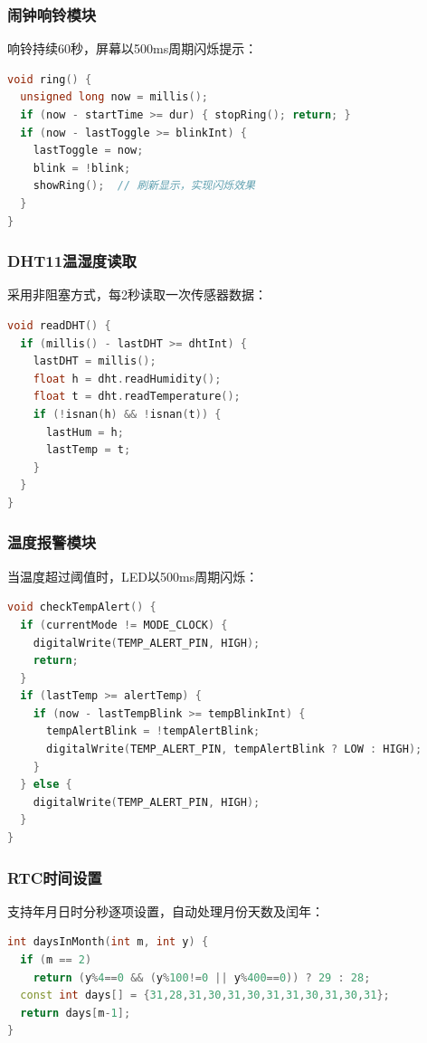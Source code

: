 \documentclass[12pt,a4paper]{article}
\begin{document}
\subsubsection*{闹钟响铃模块}
响铃持续60秒，屏幕以500ms周期闪烁提示：
\begin{lstlisting}[language=C++, caption=响铃处理函数]
void ring() {
  unsigned long now = millis();
  if (now - startTime >= dur) { stopRing(); return; }
  if (now - lastToggle >= blinkInt) {
    lastToggle = now;
    blink = !blink;
    showRing();  // 刷新显示，实现闪烁效果
  }
}
\end{lstlisting}

\subsubsection*{DHT11温湿度读取}
采用非阻塞方式，每2秒读取一次传感器数据：
\begin{lstlisting}[language=C++, caption=温湿度读取函数]
void readDHT() {
  if (millis() - lastDHT >= dhtInt) {
    lastDHT = millis();
    float h = dht.readHumidity();
    float t = dht.readTemperature();
    if (!isnan(h) && !isnan(t)) { 
      lastHum = h; 
      lastTemp = t; 
    }
  }
}
\end{lstlisting}

\subsubsection*{温度报警模块}
当温度超过阈值时，LED以500ms周期闪烁：
\begin{lstlisting}[language=C++, caption=温度报警函数]
void checkTempAlert() {
  if (currentMode != MODE_CLOCK) {
    digitalWrite(TEMP_ALERT_PIN, HIGH);
    return;
  }
  if (lastTemp >= alertTemp) {
    if (now - lastTempBlink >= tempBlinkInt) {
      tempAlertBlink = !tempAlertBlink;
      digitalWrite(TEMP_ALERT_PIN, tempAlertBlink ? LOW : HIGH);
    }
  } else {
    digitalWrite(TEMP_ALERT_PIN, HIGH);
  }
}
\end{lstlisting}

\subsubsection*{RTC时间设置}
支持年月日时分秒逐项设置，自动处理月份天数及闰年：
\begin{lstlisting}[language=C++, caption=月份天数计算]
int daysInMonth(int m, int y) {
  if (m == 2) 
    return (y%4==0 && (y%100!=0 || y%400==0)) ? 29 : 28;
  const int days[] = {31,28,31,30,31,30,31,31,30,31,30,31};
  return days[m-1];
}
\end{lstlisting}
\end{document}
